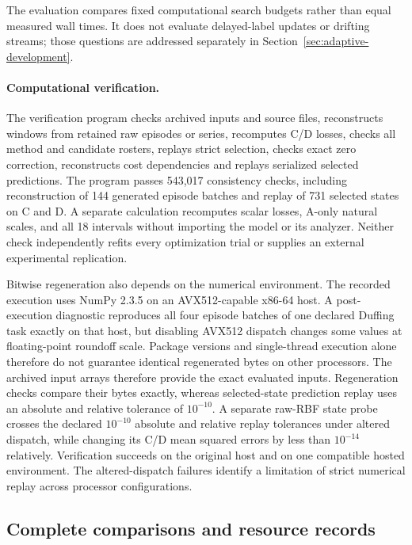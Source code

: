 The evaluation compares fixed computational search budgets rather than
equal measured wall times. It does not evaluate delayed-label updates
or drifting streams; those questions are addressed separately in
Section~\ref{sec:adaptive-development}.

\paragraph{Computational verification.}
The verification program checks archived inputs and source files, reconstructs
windows from retained raw episodes or series, recomputes C/D losses,
checks all method and candidate rosters, replays strict selection,
checks exact zero correction, reconstructs cost dependencies and
replays serialized selected predictions. The program passes 543,017 consistency checks, including reconstruction
of 144 generated episode batches and replay of 731 selected states on
C and D. A separate calculation recomputes scalar losses, A-only
natural scales, and all 18 intervals without importing the model or
its analyzer. Neither check independently refits every optimization
trial or supplies an external experimental replication.

Bitwise regeneration also depends on the numerical environment. The
recorded execution uses NumPy 2.3.5 on an AVX512-capable x86-64 host.
A post-execution diagnostic reproduces all four episode batches of one
declared Duffing task exactly on that host, but disabling AVX512 dispatch
changes some values at floating-point roundoff scale. Package versions
and single-thread execution alone therefore do not guarantee identical
regenerated bytes on other processors. The archived input arrays therefore provide the exact evaluated inputs.
Regeneration checks compare their bytes exactly, whereas selected-state
prediction replay uses an absolute and relative tolerance of $10^{-10}$.
A separate raw-RBF state probe crosses the declared $10^{-10}$ absolute
and relative replay tolerances under altered dispatch, while changing
its C/D mean squared errors by less than $10^{-14}$ relatively.
Verification succeeds on the original host and on one compatible hosted
environment. The altered-dispatch failures identify a limitation of
strict numerical replay across processor configurations.


\subsection{Complete comparisons and resource records}

